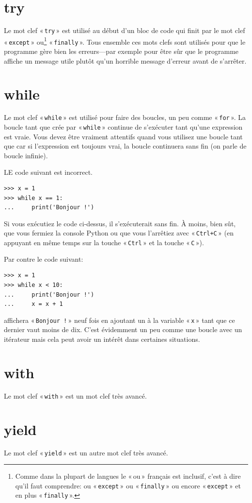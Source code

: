 \section*{try}

Le mot clef « \texttt{try} » est utilisé au début d'un bloc de code qui finit par le mot clef « \texttt{except} » ou\footnote{Comme dans la plupart de langues le « ou » français est inclusif, c'est à dire qu'il faut comprendre: ou « \texttt{except} » ou « \texttt{finally} » ou encore « \texttt{except} » et en plus « \texttt{finally} ».} « \texttt{finally} ». Tous ensemble ces mots clefs sont utilisés pour que le programme gère bien les erreurs---par exemple pour être sûr que le programme affiche un message utile plutôt qu'un horrible message d'erreur avant de s'arrêter.

\section*{while}

Le mot clef « \texttt{while} » est utilisé pour faire des boucles, un peu comme « \texttt{for} ». La boucle tant que crée par « \texttt{while} » continue de s'exécuter tant qu'une expression est vraie. Vous devez être vraiment attentifs quand vous utilisez une boucle tant que car si l'expression est toujours vrai, la boucle continuera sans fin (on parle de boucle infinie).

LE code suivant est incorrect.
\begin{Verbatim}[frame=single,rulecolor=\color{red},label="ne pas taper"]
>>> x = 1
>>> while x == 1:
...     print('Bonjour !')
\end{Verbatim}

Si vous exécutiez le code ci-dessus, il s'exécuterait sans fin. À moins, bien sût, que vous fermiez la console  Python ou que vous l'arrêtiez avec « \texttt{Ctrl+C} » (en appuyant en même temps sur la touche « \texttt{Ctrl} » et la touche « \texttt{C} »).


Par contre le code suivant:

\begin{Verbatim}[frame=single,rulecolor=\color{gray}]
>>> x = 1
>>> while x < 10:
...     print('Bonjour !')
...     x = x + 1
\end{Verbatim}

affichera « \texttt{Bonjour !} » neuf fois en ajoutant un à la variable « \texttt{x} » tant que ce dernier vaut moins de dix. C'est évidemment un peu comme une boucle avec un itérateur mais cela peut avoir un intérêt dans certaines situations.

\section*{with}
Le mot clef « \texttt{with} » est un mot clef très avancé. 

\section*{yield}
Le mot clef « \texttt{yield} » est un autre mot clef très avancé. 

\newpage